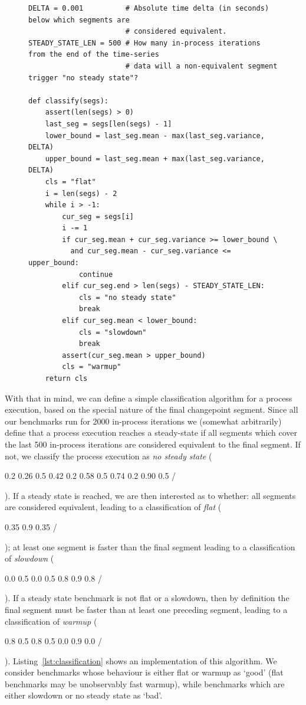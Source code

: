 \documentclass[acmsmall,screen]{acmart}
\newcommand{\numiterations}{2000\xspace}
\DeclareRobustCommand{\flatc}{%
\setlength{\sparklinethickness}{0.4pt}%
\begin{sparkline}{1.5}
\spark 0.1 0.35
       0.9 0.35
       /%
\end{sparkline}\xspace%
}
\DeclareRobustCommand{\nosteadystate}{%
\setlength{\sparklinethickness}{0.4pt}%
\begin{sparkline}{1.5}
\spark 0.1 0.2
       0.26 0.5
       0.42 0.2
       0.58 0.5
       0.74 0.2
       0.90 0.5
       /%
\end{sparkline}\xspace%
}
\DeclareRobustCommand{\warmup}{%
\setlength{\sparklinethickness}{0.4pt}%
\begin{sparkline}{1.5}
\spark 0.1 0.8
       0.5 0.8
       0.5 0.0
       0.9 0.0
       /%
\end{sparkline}\xspace%
}
\DeclareRobustCommand{\slowdown}{%
\setlength{\sparklinethickness}{0.4pt}%
\begin{sparkline}{1.5}
\spark 0.1 0.0
       0.5 0.0
       0.5 0.8
       0.9 0.8
       /%
\end{sparkline}\xspace%
}
\begin{document}
\begin{figure}[t]
\begin{lstlisting}[label=lst:classification, xleftmargin=0cm, caption={The
classification algorithm for an individual process execution. Given an ordered
list of segments (each with "mean", "variance", and "end" attributes, the latter
being the absolute index of the last iteration in the segment)
this function returns a string classifying the run sequence's warmup style.}]
DELTA = 0.001          # Absolute time delta (in seconds) below which segments are
                       # considered equivalent.
STEADY_STATE_LEN = 500 # How many in-process iterations from the end of the time-series
                       # data will a non-equivalent segment trigger "no steady state"?

def classify(segs):
    assert(len(segs) > 0)
    last_seg = segs[len(segs) - 1]
    lower_bound = last_seg.mean - max(last_seg.variance, DELTA)
    upper_bound = last_seg.mean + max(last_seg.variance, DELTA)
    cls = "flat"
    i = len(segs) - 2
    while i > -1:
        cur_seg = segs[i]
        i -= 1
        if cur_seg.mean + cur_seg.variance >= lower_bound \
          and cur_seg.mean - cur_seg.variance <= upper_bound:
            continue
        elif cur_seg.end > len(segs) - STEADY_STATE_LEN:
            cls = "no steady state"
            break
        elif cur_seg.mean < lower_bound:
            cls = "slowdown"
            break
        assert(cur_seg.mean > upper_bound)
        cls = "warmup"
    return cls
\end{lstlisting}
\vspace{-.75cm}
\end{figure}

With that in mind, we can define a simple classification algorithm for a process
execution, based on the special nature of the final changepoint segment. Since all our benchmarks run
for \numiterations in-process iterations we (somewhat arbitrarily) define that a process
execution reaches a steady-state if all segments which cover the last 500
in-process iterations are considered equivalent to the final segment. If
not, we classify the process execution as \emph{no steady state} (\nosteadystate).
If a steady state is reached, we are then interested as to whether: all
segments are considered equivalent, leading to a classification of \emph{flat} (\flatc);
at least one segment is faster than the final segment leading to a classification
of \emph{slowdown} (\slowdown). If a steady state benchmark is not flat or a
slowdown, then by definition the final segment must be faster than
at least one preceding segment, leading to a classification of \emph{warmup} (\warmup).
Listing~\ref{lst:classification} shows an implementation of this algorithm.
We consider benchmarks whose behaviour is either flat or warmup
as `good' (flat benchmarks may be unobservably fast warmup), while
benchmarks which are either slowdown or no steady state as `bad'.
\end{document}
